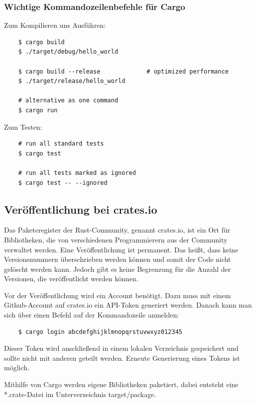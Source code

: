\subsubsection{Wichtige Kommandozeilenbefehle für Cargo}

Zum Kompilieren uns Ausführen:

\begin{lstlisting}
    $ cargo build
    $ ./target/debug/hello_world

    $ cargo build --release             # optimized performance
    $ ./target/release/hello_world

    # alternative as one command
    $ cargo run
\end{lstlisting}

Zum Testen:

\begin{lstlisting}
    # run all standard tests
    $ cargo test

    # run all tests marked as ignored
    $ cargo test -- --ignored
\end{lstlisting}

\subsection{Veröffentlichung bei crates.io}

Das Paketeregister der Rust-Community, genannt crates.io, ist ein Ort für Bibliotheken, die von verschiedenen Programmierern aus der Community verwaltet werden. Eine Veröffentlichung ist permanent. Das heißt, dass keine Versionsnummern überschrieben werden können und somit der Code nicht gelöscht werden kann. Jedoch gibt es keine Begrenzung für die Anzahl der Versionen, die veröffentlicht werden können.

Vor der Veröffentlichung wird ein Account benötigt. Dazu muss mit einem Github-Account auf crates.io ein API-Token generiert werden. Danach kann man sich über einen Befehl auf der Kommandozeile anmelden:

\begin{lstlisting}
    $ cargo login abcdefghijklmnopqrstuvwxyz012345
\end{lstlisting}

Dieser Token wird anschließend in einem lokalen Verzeichnis gespeichert und sollte nicht mit anderen geteilt werden. Erneute Generierung eines Tokens ist möglich.

Mithilfe von Cargo werden eigene Bibliotheken paketiert, dabei entsteht eine *.crate-Datei im Unterverzeichnis target/package.

